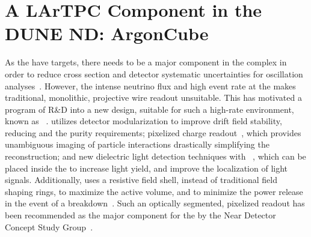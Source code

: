 \section{A LArTPC Component in the DUNE ND: ArgonCube}
\label{sec:exsum-nd-lartpc}


As the   have  targets, there needs to be a major  component in the    complex in order to reduce cross section and detector systematic uncertainties for oscillation analyses~\cite{Acciarri:2016crz, Acciarri:2015uup}. However, the intense neutrino flux and high event rate at the   makes traditional, monolithic, projective wire readout  unsuitable.  This has motivated a program of R\&D into a new  design, suitable for such a high-rate environment, known as ~\cite{argoncube_loi}.  utilizes detector modularization to improve drift field stability, reducing  and the  purity requirements; pixelized charge readout~\cite{Asaadi:2018oxk, larpix}, which provides unambiguous \threed imaging of particle interactions drastically simplifying the reconstruction; and new dielectric light detection techniques with ~\cite{Auger:2017flc}, which can be placed inside the  to increase light yield, and improve the localization of light signals. Additionally,  uses a resistive field shell, instead of traditional field shaping rings, to maximize the active volume, and to minimize the power release in the event of a breakdown~\cite{bib:docdb10419}. Such an optically segmented, pixelized readout  has been recommended as the major  component for the   by the  Near Detector Concept Study Group~\cite{dune_ndcsg}.  

